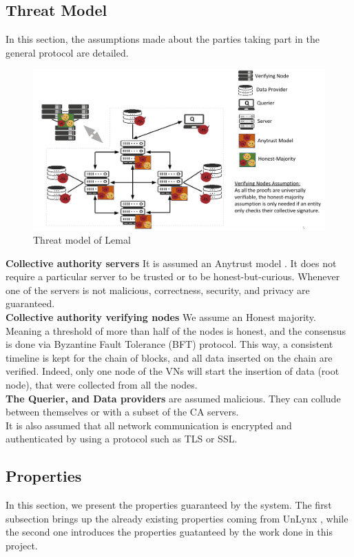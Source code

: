 \documentclass{article}
\begin{document}
\subsection{Threat Model}
In this section, the assumptions made about the parties taking part in the general protocol are detailed.
\begin{figure}[H]
\center
\includegraphics[scale=0.5]{img/threatLemal.png}
\caption{Threat model of Lemal}
\end{figure}
\textbf{Collective authority servers} It is assumed an Anytrust model \cite{anytrust}. It does not require a particular server to be trusted or to be honest-but-curious. Whenever one of the servers is not malicious, correctness, security, and privacy are guaranteed.\\
\textbf{Collective authority verifying nodes} We assume an Honest majority. Meaning a threshold of more than half of the nodes is honest, and the consensus is done via Byzantine Fault Tolerance (BFT) protocol. This way, a consistent timeline is kept for the chain of blocks, and all data inserted on the chain are verified. Indeed, only one node of the VNs will start the insertion of data (root node), that were collected from all the nodes.\\
\textbf{The Querier, and Data providers} are assumed malicious. They can collude between themselves or with a subset of the CA servers.\\
It is also assumed that all network communication is encrypted and authenticated by using a protocol such as TLS or SSL.
\subsection{Properties}
In this section, we present the properties guaranteed by the system. The first subsection brings up the already existing properties coming from UnLynx , while the second one introduces the properties guatanteed by the work done in this project.\\
\end{document}
